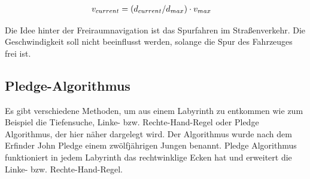 \begin{align}\label{regelungGeschwindigkeit}
\centering
\begin{split}
v_{current} &= (d_{current}/d_{max}) \cdot v_{max}
\end{split}
\end{align}

Die Idee hinter der Freiraumnavigation ist das Spurfahren im Straßenverkehr. Die Geschwindigkeit soll nicht beeinflusst werden, solange die Spur des Fahrzeuges frei ist. \cite[S.266 ff]{RobotikSichtInformatik.2012}

    
        
        

\subsection{Pledge-Algorithmus} \label{Pledge_Algo}
Es gibt verschiedene Methoden, um aus einem Labyrinth zu entkommen wie zum Beispiel die Tiefensuche, Linke- bzw. Rechte-Hand-Regel oder Pledge Algorithmus, der hier näher dargelegt wird. Der Algorithmus wurde nach dem Erfinder John Pledge einem zwölfjährigen Jungen benannt. Pledge Algorithmus funktioniert in jedem Labyrinth das rechtwinklige Ecken hat und erweitert die Linke- bzw. Rechte-Hand-Regel. 

